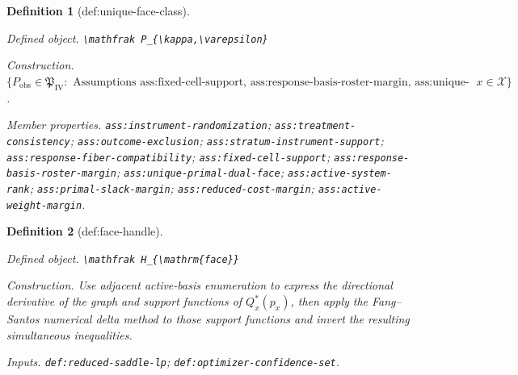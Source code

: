 \documentclass{article}
\newtheorem{definition}{Definition}
\begin{document}
\begin{definition}[def:unique-face-class]\label{def:unique-face-class}
\par\smallskip\noindent\emph{Defined object.} \texttt{\textbackslash{}\allowbreak{}mathfrak P\_\allowbreak{}\{\textbackslash{}\allowbreak{}kappa,\allowbreak{}\textbackslash{}\allowbreak{}varepsilon\}\allowbreak{}}
\par\smallskip\noindent\emph{Construction.} \(\{P_{\mathrm{obs}}\in\mathfrak P_{\mathrm{IV}}:\text{ Assumptions ass:fixed-cell-support, ass:response-basis-roster-margin, ass:unique-primal-dual-face, ass:active-system-rank, ass:primal-slack-margin, ass:reduced-cost-margin, and ass:active-weight-margin hold for every }x\in\mathcal X\}\).
\par\smallskip\noindent\emph{Member properties.} \texttt{ass:\allowbreak{}instrument-\allowbreak{}randomization}; \texttt{ass:\allowbreak{}treatment-\allowbreak{}consistency}; \texttt{ass:\allowbreak{}outcome-\allowbreak{}exclusion}; \texttt{ass:\allowbreak{}stratum-\allowbreak{}instrument-\allowbreak{}support}; \texttt{ass:\allowbreak{}response-\allowbreak{}fiber-\allowbreak{}compatibility}; \texttt{ass:\allowbreak{}fixed-\allowbreak{}cell-\allowbreak{}support}; \texttt{ass:\allowbreak{}response-\allowbreak{}basis-\allowbreak{}roster-\allowbreak{}margin}; \texttt{ass:\allowbreak{}unique-\allowbreak{}primal-\allowbreak{}dual-\allowbreak{}face}; \texttt{ass:\allowbreak{}active-\allowbreak{}system-\allowbreak{}rank}; \texttt{ass:\allowbreak{}primal-\allowbreak{}slack-\allowbreak{}margin}; \texttt{ass:\allowbreak{}reduced-\allowbreak{}cost-\allowbreak{}margin}; \texttt{ass:\allowbreak{}active-\allowbreak{}weight-\allowbreak{}margin}.
\end{definition}

\begin{definition}[def:face-handle]\label{def:face-handle}
\par\smallskip\noindent\emph{Defined object.} \texttt{\textbackslash{}\allowbreak{}mathfrak H\_\allowbreak{}\{\textbackslash{}\allowbreak{}mathrm\{face\}\allowbreak{}\}\allowbreak{}}
\par\smallskip\noindent\emph{Construction.} Use adjacent active-basis enumeration to express the directional derivative of the graph and support functions of \(Q_x^*(p_x)\), then apply the Fang--Santos numerical delta method to those support functions and invert the resulting simultaneous inequalities.
\par\smallskip\noindent\emph{Inputs.} \texttt{def:\allowbreak{}reduced-\allowbreak{}saddle-\allowbreak{}lp}; \texttt{def:\allowbreak{}optimizer-\allowbreak{}confidence-\allowbreak{}set}.
\end{definition}
\end{document}
